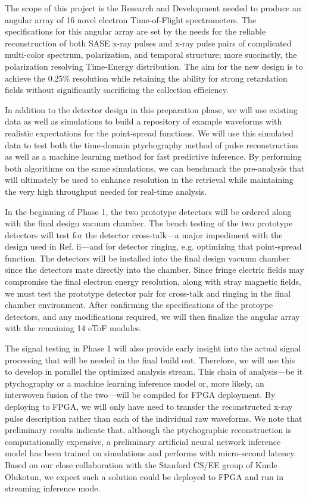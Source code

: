 The scope of this project is the Research and Development needed to produce an angular array of 16 novel electron Time-of-Flight spectrometers.  
The specifications for this angular array are set by the needs for the reliable reconstruction of both SASE x-ray pulses and x-ray pulse pairs of complicated multi-color spectrum, polarization, and temporal structure; more succinctly, the polarization resolving Time-Energy distribution.
The aim for the new design is to achieve the 0.25\% resolution while retaining the ability for strong retardation fields without significantly sacrificing the collection efficiency.  



In addition to the detector design in this preparation phase, we will use existing data as well as simulations to build a repository of example waveforms with realistic expectations for the point-spread functions.  
We will use this simulated data to test both the time-domain ptychography method of pulse reconstruction as well as a machine learning method for fast predictive inference.
By performing both algorithms on the same simulations, we can benchmark the pre-analysis that will ultimately be used to enhance resolution in the retrieval while maintaining the very high throughput needed for real-time analysis.

In the beginning of Phase 1, the two prototype detectors will be ordered along with the final design vacuum chamber. 
The bench testing of the two prototype detectors will test for the detector cross-talk—a major impediment with the design used in Ref. ii—and for detector ringing, e.g. optimizing that point-spread function.  
The detectors will be installed into the final design vacuum chamber since the detectors mate directly into the chamber.  
Since fringe electric fields may compromise the final electron energy resolution, along with stray magnetic fields, we must test the prototype detector pair for cross-talk and ringing in the final chamber environment.  
After confirming the specifications of the protoype detectors, and any modifications required, we will then finalize the angular array with the remaining 14 eToF modules.

The signal testing in Phase 1 will also provide early insight into the actual signal processing that will be needed in the final build out.  
Therefore, we will use this to develop in parallel the optimized analysis stream.  
This chain of analysis—be it ptychography or a machine learning inference model or, more likely, an interwoven fusion of the two—will be compiled for FPGA deployment.  
By deploying to FPGA, we will only have need to transfer the reconstructed x-ray pulse description rather than each of the individual raw waveforms. 
We note that preliminary results indicate that, although the ptychographic reconstruction is computationally expensive, a preliminary artificial neural network inference model has been trained on simulations and performs with micro-second latency.  
Based on our close collaboration with the Stanford CS/EE group of Kunle Olukotun, we expect such a solution could be deployed to FPGA and run in streaming inference mode.


